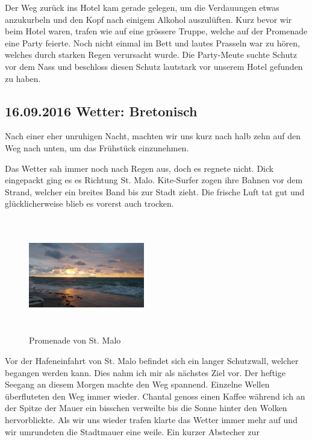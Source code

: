 Der Weg zurück ins Hotel kam gerade gelegen, um die Verdauungen etwas anzukurbeln und den Kopf nach einigem Alkohol auszulüften.
Kurz bevor wir beim Hotel waren, trafen wie auf eine grössere Truppe, welche auf der Promenade eine Party feierte.
Noch nicht einmal im Bett und lautes Prasseln war zu hören, welches durch starken Regen verursacht wurde.
Die Party-Meute suchte Schutz vor dem Nass und beschloss diesen Schutz lautstark vor unserem Hotel gefunden zu haben.

\subsection{16.09.2016 Wetter: Bretonisch}
Nach einer eher unruhigen Nacht, machten wir uns kurz nach halb zehn auf den Weg nach unten, um das Frühstück einzunehmen.

Das Wetter sah immer noch nach Regen aus, doch es regnete nicht.
Dick eingepackt ging es es Richtung St. Malo.
Kite-Surfer zogen ihre Bahnen vor dem Strand, welcher ein breites Band bis zur Stadt zieht.
Die frische Luft tat gut und glücklicherweise blieb es vorerst auch trocken.

\begin{figure} 
  \begin{centering}
    \includegraphics[width=0.45\textwidth, height=5cm, keepaspectratio]{../Bilder/Bretagne/165.jpg}
    \caption{Promenade von St. Malo}
  \end{centering}
\end{figure} 

Vor der Hafeneinfahrt von St. Malo befindet sich ein langer Schutzwall, welcher begangen werden kann.
Dies nahm ich mir als nächstes Ziel vor.
Der heftige Seegang an diesem Morgen machte den Weg spannend.
Einzelne Wellen überfluteten den Weg immer wieder.
Chantal genoss einen Kaffee während ich an der Spitze der Mauer ein bisschen verweilte bis die Sonne hinter den Wolken hervorblickte.
Als wir uns wieder trafen klarte das Wetter immer mehr auf und wir umrundeten die Stadtmauer eine weile.
Ein kurzer Abstecher zur

